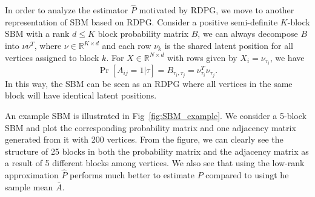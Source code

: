 \documentclass[10pt,letterpaper]{article}
\begin{document}
In order to analyze the estimator $\hat{P}$ motivated by RDPG, we move to another representation of SBM based on RDPG. 
Consider a positive semi-definite $K$-block SBM with a rank $d\le K$ block probability matrix $B$, we can always decompose $B$ into $\nu \nu^T$, where $\nu \in \mathbb{R}^{K \times d}$ and each row $\nu_k$ is the shared latent position for all vertices assigned to block $k$. 
For $X \in \mathbb{R}^{N \times d}$ with rows given by $X_i = \nu_{\tau_i}$, we have
\[
    \Pr[A_{ij} = 1|\tau] = B_{\tau_i, \tau_j} = \nu_{\tau_i}^T \nu_{\tau_j}.
\]
In this way, the SBM can be seen as an RDPG where all vertices in the same block will have identical latent positions.

An example SBM is illustrated in Fig~\ref{fig:SBM_example}.
We consider a 5-block SBM and plot the corresponding probability matrix and one adjacency matrix generated from it with 200 vertices. From the figure, we can clearly see the structure of 25 blocks in both the probability matrix and the adjacency matrix as a result of 5 different blocks among vertices.
We also see that using the low-rank approximation $\hat{P}$ performs much better to estimate $P$ compared to usingt he sample mean $\bar{A}$.
\end{document}
